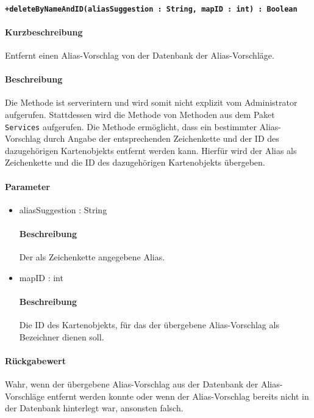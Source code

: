 \paragraph*{\texttt{+deleteByNameAndID(aliasSuggestion : String, mapID : int) : Boolean}}%
\paragraph*{Kurzbeschreibung}
Entfernt einen Alias-Vorschlag von der Datenbank der Alias-Vorschläge.
\paragraph*{Beschreibung}
Die Methode ist serverintern und wird somit nicht explizit vom Administrator aufgerufen.
Stattdessen wird die Methode von Methoden aus dem Paket \texttt{Services} aufgerufen.
Die Methode ermöglicht, dass ein bestimmter Alias-Vorschlag durch Angabe der entsprechenden Zeichenkette und der ID des dazugehörigen Kartenobjekts entfernt werden kann.
Hierfür wird der Alias als Zeichenkette und die ID des dazugehörigen Kartenobjekts übergeben.
\paragraph*{Parameter}
\begin{itemize}
    \item aliasSuggestion : String
    		\paragraph*{Beschreibung}
    		Der als Zeichenkette angegebene Alias.
    	\item mapID : int
    		\paragraph*{Beschreibung}
    		Die ID des Kartenobjekts, für das der übergebene Alias-Vorschlag als Bezeichner dienen soll.
\end{itemize}
\paragraph*{Rückgabewert}
Wahr, wenn der übergebene Alias-Vorschlag aus der Datenbank der Alias-Vorschläge entfernt werden konnte oder wenn der Alias-Vorschlag bereits nicht in der Datenbank hinterlegt war, ansonsten falsch.
